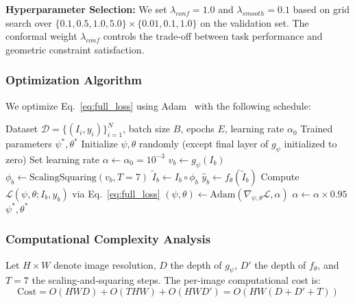\textbf{Hyperparameter Selection:} We set $\lambda_{conf} = 1.0$ and $\lambda_{smooth} = 0.1$ based on grid search over $\{0.1, 0.5, 1.0, 5.0\} \times \{0.01, 0.1, 1.0\}$ on the validation set. The conformal weight $\lambda_{conf}$ controls the trade-off between task performance and geometric constraint satisfaction.

\subsubsection{Optimization Algorithm}

We optimize Eq.~\eqref{eq:full_loss} using Adam~\cite{kingma2014adam} with the following schedule:

\begin{algorithm}[t]
\caption{DCA Training Procedure}
\label{alg:training}
\begin{algorithmic}[1]
\REQUIRE Dataset $\mathcal{D} = \{(I_i, y_i)\}_{i=1}^N$, batch size $B$, epochs $E$, learning rate $\alpha_0$
\ENSURE Trained parameters $\psi^*, \theta^*$
\STATE Initialize $\psi, \theta$ randomly (except final layer of $g_\psi$ initialized to zero)
\STATE Set learning rate $\alpha \leftarrow \alpha_0 = 10^{-3}$
        \STATE $v_b \leftarrow g_\psi(I_b)$ 
        \STATE $\phi_b \leftarrow \text{ScalingSquaring}(v_b, T=7)$ 
        \STATE $\tilde{I}_b \leftarrow I_b \circ \phi_b$ 
        \STATE $\hat{y}_b \leftarrow f_\theta(\tilde{I}_b)$ 
        \STATE Compute $\mathcal{L}(\psi, \theta; I_b, y_b)$ via Eq.~\eqref{eq:full_loss}
        \STATE $(\psi, \theta) \leftarrow \text{Adam}(\nabla_{\psi,\theta} \mathcal{L}, \alpha)$ 
    \ENDFOR
        \STATE $\alpha \leftarrow \alpha \times 0.95$ 
    \ENDIF
\ENDFOR
\RETURN $\psi^*, \theta^*$
\end{algorithmic}
\end{algorithm}

\subsubsection{Computational Complexity Analysis}

Let $H \times W$ denote image resolution, $D$ the depth of $g_\psi$, $D'$ the depth of $f_\theta$, and $T=7$ the scaling-and-squaring steps. The per-image computational cost is:
\begin{equation}
\text{Cost} = O(HWD) + O(THW) + O(HWD') = O(HW(D + D' + T))
\end{equation}

